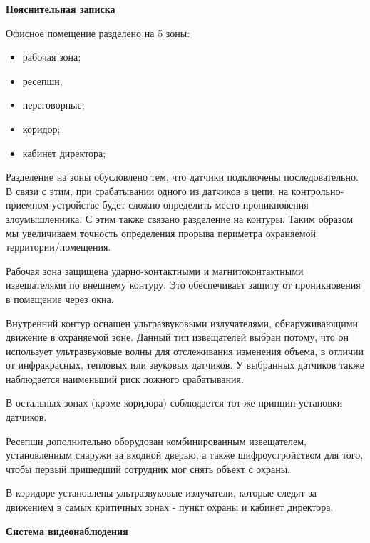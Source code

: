 \documentclass[a4paper,14pt]{extarticle}
\begin{document}
    \textbf{Пояснительная записка}
    \begin{spacing}{1.25}
        Офисное помещение разделено на 5 зоны:
        \vspace{-1ex}
        \begin{spacing}{0.5}
            \begin{itemize}
                \item рабочая зона;
                \item ресепшн;
                \item переговорные; 
                \item коридор;
                \item кабинет директора;
            \end{itemize}
        \end{spacing}
        Разделение на зоны обусловлено тем, что датчики подключены последовательно. В связи с этим, при срабатывании одного из датчиков в цепи, на контрольно-приемном устройстве будет сложно определить место проникновения злоумышленника. С этим также связано разделение на контуры. Таким образом мы увеличиваем точность определения прорыва периметра охраняемой территории/помещения.

        Рабочая зона защищена ударно-контактными и магнитоконтактными извещателями по внешнему контуру. Это обеспечивает защиту от проникновения в помещение через окна.

        Внутренний контур оснащен ультразвуковыми излучателями, обнаруживающими движение в охраняемой зоне. Данный тип извещателей выбран потому, что он использует ультразвуковые волны для отслеживания изменения объема, в отличии от инфракрасных, тепловых или звуковых датчиков. У выбранных датчиков также наблюдается наименьший риск ложного срабатывания. 

        В остальных зонах (кроме коридора) соблюдается тот же принцип установки датчиков. 

        Ресепшн дополнительно оборудован комбинированным извещателем, установленным снаружи за входной дверью, а также шифроустройством для того, чтобы первый пришедший сотрудник мог снять объект с охраны. 

        В коридоре установлены ультразвуковые излучатели, которые следят за движением в самых критичных зонах - пункт охраны и кабинет директора.
    \end{spacing}
    
    \newpage
    \textbf{\large{Система видеонаблюдения}}
\end{document}
